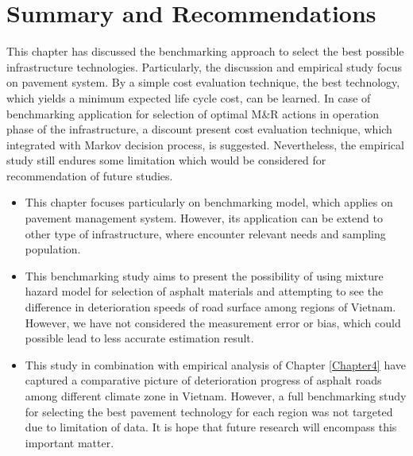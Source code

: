 \section{Summary and Recommendations}
This chapter has discussed the benchmarking approach to select the best possible infrastructure technologies. Particularly, the discussion and empirical study focus on pavement system. By a simple cost evaluation technique, the best technology, which yields a minimum expected life cycle cost, can be learned. In case of benchmarking application for selection of optimal M\&R actions in operation phase of the infrastructure, a discount present cost evaluation technique, which integrated with Markov decision process, is suggested. Nevertheless, the empirical study still endures some limitation which would be considered for recommendation of future studies.
\begin{itemize}
\item This chapter focuses particularly on benchmarking model, which applies on pavement management system. However, its application can be extend to other type of infrastructure, where encounter relevant needs and sampling population.
\item This benchmarking study aims to present the possibility of using mixture hazard model for selection of asphalt materials and attempting to see the difference in deterioration speeds of road surface among regions of Vietnam. However, we have not considered the measurement error or bias, which could possible lead to less accurate estimation result.
\item This study in combination with empirical analysis of Chapter \ref{Chapter4} have captured a comparative picture of deterioration progress of asphalt roads among different climate zone in Vietnam. However, a full benchmarking study for selecting the best pavement technology for each region was not targeted due to limitation of data. It is hope that future research will encompass this important matter.
\end{itemize}